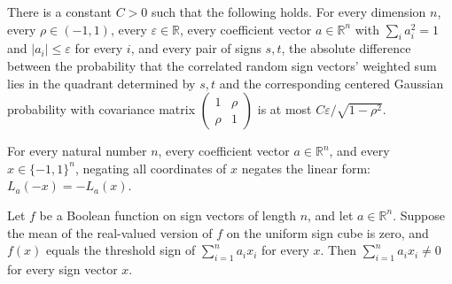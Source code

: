 \begin{theorem}
\label{FABL.exists_exercise5_33c_constant}
\leanok
{}
There is a constant $C>0$ such that the following holds. For every dimension $n$, every
$\rho\in(-1,1)$, every $\varepsilon\in\mathbb R$, every coefficient vector $a\in\mathbb
R^n$ with $\sum_i a_i^2=1$ and $|a_i|\le\varepsilon$ for every $i$, and every pair of
signs $s,t$, the absolute difference between the probability that the correlated random
sign vectors’ weighted sum lies in the quadrant determined by $s,t$ and the
corresponding centered Gaussian probability with covariance matrix
$\begin{pmatrix}1&\rho\\\rho&1\end{pmatrix}$ is at most $C\varepsilon/\sqrt{1-\rho^2}$.
\end{theorem}

\begin{theorem}
\label{FABL.linearForm_neg_input_regularThreshold}
\leanok
{}
For every natural number $n$, every coefficient vector $a\in\mathbb{R}^n$, and every
$x\in\{-1,1\}^n$, negating all coordinates of $x$ negates the linear form:
$L_a(-x)=-L_a(x)$.
\end{theorem}

\begin{theorem}
\label{FABL.homogeneousThreshold_linearForm_ne_zero_of_balanced}
\leanok
{}
Let $f$ be a Boolean function on sign vectors of length $n$, and let $a\in\mathbb{R}^n$.
Suppose the mean of the real-valued version of $f$ on the uniform sign cube is zero, and
$f(x)$ equals the threshold sign of $\sum_{i=1}^n a_i x_i$ for every $x$. Then
$\sum_{i=1}^n a_i x_i\ne 0$ for every sign vector $x$.
\end{theorem}

